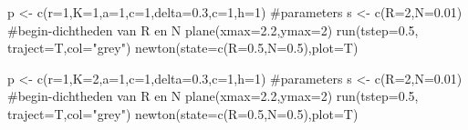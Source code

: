 \documentclass[
  a4paper,
]{scrbook}
\newenvironment{Shaded}{\begin{snugshade}}{\end{snugshade}}
\newcommand{\AttributeTok}[1]{\textcolor[rgb]{0.40,0.45,0.13}{#1}}
\newcommand{\CommentTok}[1]{\textcolor[rgb]{0.37,0.37,0.37}{#1}}
\newcommand{\DecValTok}[1]{\textcolor[rgb]{0.68,0.00,0.00}{#1}}
\newcommand{\FloatTok}[1]{\textcolor[rgb]{0.68,0.00,0.00}{#1}}
\newcommand{\FunctionTok}[1]{\textcolor[rgb]{0.28,0.35,0.67}{#1}}
\newcommand{\NormalTok}[1]{\textcolor[rgb]{0.00,0.23,0.31}{#1}}
\newcommand{\OtherTok}[1]{\textcolor[rgb]{0.00,0.23,0.31}{#1}}
\newcommand{\StringTok}[1]{\textcolor[rgb]{0.13,0.47,0.30}{#1}}
\theoremstyle{definition}
\theoremstyle{remark}
\begin{document}
\begin{Shaded}
\begin{Highlighting}[]
\NormalTok{p }\OtherTok{\textless{}{-}} \FunctionTok{c}\NormalTok{(}\AttributeTok{r=}\DecValTok{1}\NormalTok{,}\AttributeTok{K=}\DecValTok{1}\NormalTok{,}\AttributeTok{a=}\DecValTok{1}\NormalTok{,}\AttributeTok{c=}\DecValTok{1}\NormalTok{,}\AttributeTok{delta=}\FloatTok{0.3}\NormalTok{,}\AttributeTok{c=}\DecValTok{1}\NormalTok{,}\AttributeTok{h=}\DecValTok{1}\NormalTok{)  }\CommentTok{\#parameters}
\NormalTok{s }\OtherTok{\textless{}{-}} \FunctionTok{c}\NormalTok{(}\AttributeTok{R=}\DecValTok{2}\NormalTok{,}\AttributeTok{N=}\FloatTok{0.01}\NormalTok{) }\CommentTok{\#begin{-}dichtheden van R en N  }
\FunctionTok{plane}\NormalTok{(}\AttributeTok{xmax=}\FloatTok{2.2}\NormalTok{,}\AttributeTok{ymax=}\DecValTok{2}\NormalTok{)}
\FunctionTok{run}\NormalTok{(}\AttributeTok{tstep=}\FloatTok{0.5}\NormalTok{, }\AttributeTok{traject=}\NormalTok{T,}\AttributeTok{col=}\StringTok{"grey"}\NormalTok{)}
\FunctionTok{newton}\NormalTok{(}\AttributeTok{state=}\FunctionTok{c}\NormalTok{(}\AttributeTok{R=}\FloatTok{0.5}\NormalTok{,}\AttributeTok{N=}\FloatTok{0.5}\NormalTok{),}\AttributeTok{plot=}\NormalTok{T)}

\NormalTok{p }\OtherTok{\textless{}{-}} \FunctionTok{c}\NormalTok{(}\AttributeTok{r=}\DecValTok{1}\NormalTok{,}\AttributeTok{K=}\DecValTok{2}\NormalTok{,}\AttributeTok{a=}\DecValTok{1}\NormalTok{,}\AttributeTok{c=}\DecValTok{1}\NormalTok{,}\AttributeTok{delta=}\FloatTok{0.3}\NormalTok{,}\AttributeTok{c=}\DecValTok{1}\NormalTok{,}\AttributeTok{h=}\DecValTok{1}\NormalTok{)  }\CommentTok{\#parameters}
\NormalTok{s }\OtherTok{\textless{}{-}} \FunctionTok{c}\NormalTok{(}\AttributeTok{R=}\DecValTok{2}\NormalTok{,}\AttributeTok{N=}\FloatTok{0.01}\NormalTok{) }\CommentTok{\#begin{-}dichtheden van R en N  }
\FunctionTok{plane}\NormalTok{(}\AttributeTok{xmax=}\FloatTok{2.2}\NormalTok{,}\AttributeTok{ymax=}\DecValTok{2}\NormalTok{)}
\FunctionTok{run}\NormalTok{(}\AttributeTok{tstep=}\FloatTok{0.5}\NormalTok{, }\AttributeTok{traject=}\NormalTok{T,}\AttributeTok{col=}\StringTok{"grey"}\NormalTok{)}
\FunctionTok{newton}\NormalTok{(}\AttributeTok{state=}\FunctionTok{c}\NormalTok{(}\AttributeTok{R=}\FloatTok{0.5}\NormalTok{,}\AttributeTok{N=}\FloatTok{0.5}\NormalTok{),}\AttributeTok{plot=}\NormalTok{T)}
\end{Highlighting}
\end{Shaded}
\end{document}

